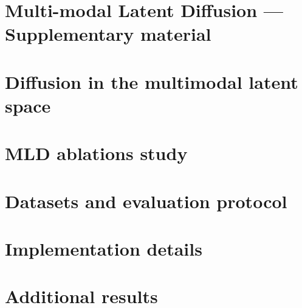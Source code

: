 
\setcounter{section}{0}
\renewcommand{\thesection}{\Alph{section}}
\renewcommand{\theHsection}{appendixsection.\Alph{section}}


\section*{Multi-modal Latent Diffusion --- Supplementary material}

\section{Diffusion in  the multimodal latent space}
\label{apdx:mld_details}


\newpage
\section{MLD ablations study}
\label{apdx:mld_variants}


\newpage
\section{Datasets and evaluation protocol}
\label{apdx:dataset_eval}


\newpage
\section{Implementation details}
\label{apdx:implementation}


\newpage
\section{Additional results}
\label{apdx:additionnal_res}

